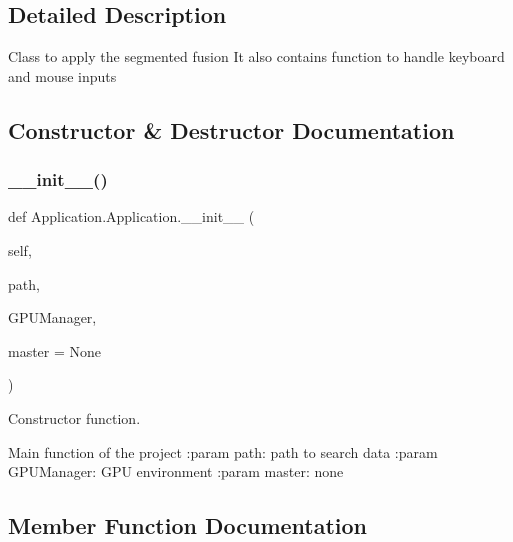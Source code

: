 \subsection{Detailed Description}
\begin{DoxyVerb}Class to apply the segmented fusion
It also contains function to handle keyboard and mouse inputs
\end{DoxyVerb}
 

\subsection{Constructor \& Destructor Documentation}
\mbox{\label{class_application_1_1_application_a0a1efa05f27e797bfc72d43dd12df6b5}} 
\subsubsection{\texorpdfstring{\+\_\+\+\_\+init\+\_\+\+\_\+()}{\_\_init\_\_()}}
{\footnotesize\ttfamily def Application.\+Application.\+\_\+\+\_\+init\+\_\+\+\_\+ (\begin{DoxyParamCaption}\item[{}]{self,  }\item[{}]{path,  }\item[{}]{G\+P\+U\+Manager,  }\item[{}]{master = {\ttfamily None} }\end{DoxyParamCaption})}



Constructor function. 

\begin{DoxyVerb}Main function of the project
:param path: path to search data
:param GPUManager: GPU environment
:param master: none
\end{DoxyVerb}
 

\subsection{Member Function Documentation}
\mbox{\label{class_application_1_1_application_a3280e6b8e4616a56567d0daf7f60ff23}} 
